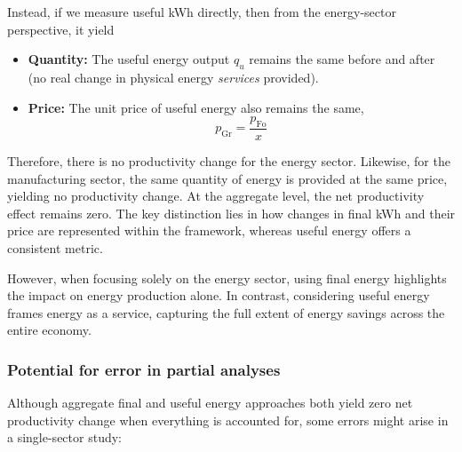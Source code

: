 \documentclass[11pt]{article}
\begin{document}
{Instead, if we measure useful kWh directly, then from the energy-sector perspective, it yield

\begin{itemize}
    \item \textbf{Quantity:} The useful energy output $q_u$ remains the same before and after (no real change in physical energy \emph{services} provided).
    \item \textbf{Price:} The unit price of useful energy also remains the same, 
\begin{equation*}
     p_{\mathrm{Gr}} = \frac{p_{\mathrm{Fo}}}{x}
\end{equation*}
\end{itemize}

Therefore, there is no productivity change for the energy sector. Likewise, for the manufacturing sector, the same quantity of energy is provided at the same price, yielding no productivity change. At the aggregate level, the net productivity effect remains zero. The key distinction lies in how changes in final kWh and their price are represented within the framework, whereas useful energy offers a consistent metric.

However, when focusing solely on the energy sector, using final energy highlights the impact on energy production alone. In contrast, considering useful energy frames energy as a service, capturing the full extent of energy savings across the entire economy.

\subsubsection{Potential for error in partial analyses}

Although aggregate final and useful energy approaches both yield zero net productivity change when everything is accounted for, some errors might arise in a single-sector study:

}
\end{document}

